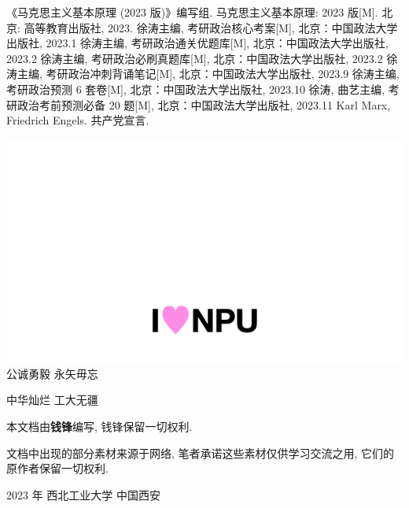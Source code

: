 \documentclass[10pt, UTF8]{book} %
\begin{document}
\newpage
\thispagestyle{empty}
\begin{thebibliography}{1}
    《马克思主义基本原理 (2023 版)》编写组. 马克思主义基本原理: 2023 版[M].
    北京: 高等教育出版社, 2023.
    徐涛主编, 考研政治核心考案[M], 北京：中国政法大学出版社, 2023.1
    徐涛主编, 考研政治通关优题库[M], 北京：中国政法大学出版社, 2023.2
    徐涛主编, 考研政治必刷真题库[M], 北京：中国政法大学出版社, 2023.2
    徐涛主编, 考研政治冲刺背诵笔记[M], 北京：中国政法大学出版社, 2023.9
    徐涛主编, 考研政治预测 6 套卷[M], 北京：中国政法大学出版社, 2023.10
    徐涛, 曲艺主编, 考研政治考前预测必备 20 题[M], 北京：中国政法大学出版社, 2023.11
    Karl Marx, Friedrich Engels. 共产党宣言.
\end{thebibliography}

\newpage
\thispagestyle{empty}
\vspace*{5cm}
\begin{center}
    \includegraphics*[width=\textwidth]{pic/i_love_npu.jpeg}
    \large
    公诚勇毅 \quad 永矢毋忘

    中华灿烂 \quad 工大无疆
\end{center}
\vspace*{13em}
\begin{center}
    \small
    本文档由\textbf{钱锋}编写, 钱锋保留一切权利.

    文档中出现的部分素材来源于网络, 笔者承诺这些素材仅供学习交流之用, 
    它们的原作者保留一切权利.

    2023 年 \quad 西北工业大学 \quad 中国西安 
\end{center}
\end{document}
